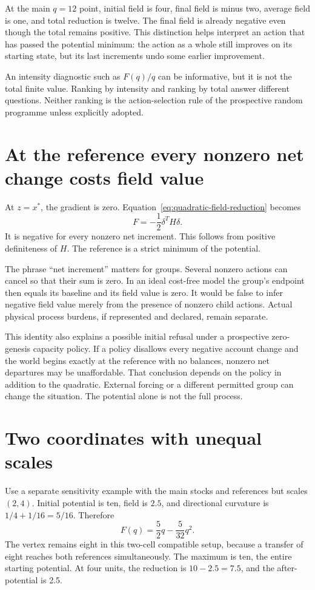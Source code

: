 At the main \(q=12\) point, initial field is four, final field is minus two, average field is one, and total reduction is twelve. The final field is already negative even though the total remains positive. This distinction helps interpret an action that has passed the potential minimum: the action as a whole still improves on its starting state, but its last increments undo some earlier improvement.

An intensity diagnostic such as \(F(q)/q\) can be informative, but it is not the total finite value. Ranking by intensity and ranking by total answer different questions. Neither ranking is the action-selection rule of the prospective random programme unless explicitly adopted.

\section{At the reference every nonzero net change costs field value}
At \(z=x^*\), the gradient is zero. Equation~\ref{eq:quadratic-field-reduction} becomes
\begin{equation}
 F=-\frac12\delta^TH\delta.
\end{equation}
It is negative for every nonzero net increment. This follows from positive definiteness of \(H\). The reference is a strict minimum of the potential.

The phrase ``net increment'' matters for groups. Several nonzero actions can cancel so that their sum is zero. In an ideal cost-free model the group's endpoint then equals its baseline and its field value is zero. It would be false to infer negative field value merely from the presence of nonzero child actions. Actual physical process burdens, if represented and declared, remain separate.

This identity also explains a possible initial refusal under a prospective zero-genesis capacity policy. If a policy disallows every negative account change and the world begins exactly at the reference with no balances, nonzero net departures may be unaffordable. That conclusion depends on the policy in addition to the quadratic. External forcing or a different permitted group can change the situation. The potential alone is not the full process.

\section{Two coordinates with unequal scales}
Use a separate sensitivity example with the main stocks and references but scales \((2,4)\). Initial potential is ten, field is \(2.5\), and directional curvature is \(1/4+1/16=5/16\). Therefore
\begin{equation}
 F(q)=\frac52q-\frac{5}{32}q^2.
\end{equation}
The vertex remains eight in this two-cell compatible setup, because a transfer of eight reaches both references simultaneously. The maximum is ten, the entire starting potential. At four units, the reduction is \(10-2.5=7.5\), and the after-potential is 2.5.

